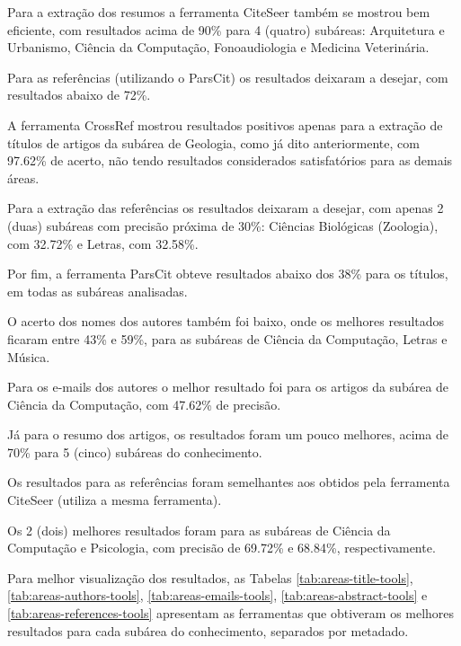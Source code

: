 Para a extração dos resumos a ferramenta CiteSeer também se mostrou bem eficiente, com resultados acima de 90\% para 4 (quatro) subáreas: Arquitetura e Urbanismo, Ciência da Computação, Fonoaudiologia e Medicina Veterinária. 

Para as referências (utilizando o ParsCit) os resultados deixaram a desejar, com resultados abaixo de 72\%.

A ferramenta CrossRef mostrou resultados positivos apenas para a extração de títulos de artigos da subárea de Geologia, como já dito anteriormente, com 97.62\% de acerto, não tendo resultados considerados satisfatórios para as demais áreas. 

Para a extração das referências os resultados deixaram a desejar, com apenas 2 (duas) subáreas com precisão próxima de 30\%: Ciências Biológicas (Zoologia), com 32.72\% e Letras, com 32.58\%.

Por fim, a ferramenta ParsCit obteve resultados abaixo dos 38\% para os títulos, em todas as subáreas analisadas. 

O acerto dos nomes dos autores também foi baixo, onde os melhores resultados ficaram entre 43\% e 59\%, para as subáreas de Ciência da Computação, Letras e Música. 

Para os e-mails dos autores o melhor resultado foi para os artigos da subárea de Ciência da Computação, com 47.62\% de precisão. 

Já para o resumo dos artigos, os resultados foram um pouco melhores, acima de 70\% para 5 (cinco) subáreas do conhecimento. 

Os resultados para as referências foram semelhantes aos obtidos pela ferramenta CiteSeer (utiliza a mesma ferramenta). 

Os 2 (dois) melhores resultados foram para as subáreas de Ciência da Computação e Psicologia, com precisão de 69.72\% e 68.84\%, respectivamente.

Para melhor visualização dos resultados, as Tabelas \ref{tab:areas-title-tools}, \ref{tab:areas-authors-tools}, \ref{tab:areas-emails-tools}, \ref{tab:areas-abstract-tools} e \ref{tab:areas-references-tools} apresentam as ferramentas que obtiveram os melhores resultados para cada subárea do conhecimento, separados por metadado. 

